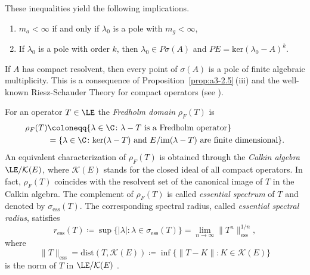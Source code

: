 \begin{example}
These inequalities yield the following implications.
\begin{enumerate}[\upshape (i)]
\item
$m_{a} < \infty$ if and only if\/ $\lambda_{0}$ is a pole with $m_{g} < \infty$,
\item
If\/ $\lambda_{0}$ is a pole with order $k$, then $\lambda_{0} \in P\sigma(A)$ and $PE = \text{ker}(\lambda_{0} - A)^{k}$.
\end{enumerate}
If\/ $A$ has compact resolvent,%
then every point of\/ $\sigma(A)$ is a pole of finite algebraic multiplicity.
This is a consequence of Proposition~\ref{prop:a3-2.5}\,(iii) and the well-known Riesz-Schauder Theory for compact operators (see \textcite[VII.4.5]{dunfordschwartz:1958}).
\end{example}
\begin{example}\label{ex:a3-3.7}	%
For an operator $T \in \LE$ the \emph{Fredholm domain} $\rho_{F}(T)$ is
\begin{equation}\label{eq:a3-3.5} 
\begin{aligned}
	\rho_{F}(T) & \coloneqq  \{\lambda \in \C \colon \lambda - T \text{ is a Fredholm operator}\}\\
	& =  \{\lambda \in \C \colon \text{ker}(\lambda - T) \text{ and }  E / \mathrm{im}(\lambda - T) \text{ are finite dimensional}\}.
\end{aligned}
\end{equation}
An equivalent characterization of\/ $\rho_{F}(T)$ is obtained through the \emph{Calkin algebra}%
$\LE/\mathcal{K}(E)$, where $\mathcal{K}(E)$ stands for the closed ideal of all compact operators.
In fact, $\rho_{F}(T)$ coincides with the resolvent set of the canonical image of\/ $T$ in the Calkin algebra.
The complement of\/ $\rho_{F}(T)$ is called \emph{essential spectrum} 
of\/ $T$ and denoted by $\sigma_{\text{ess}}(T)$.
The corresponding spectral radius, called \emph{essential spectral radius},  
satisfies
\begin{equation}\label{eq:a3-3.6}
r_{\text{ess}}(T) \coloneqq \sup \{|\lambda| \colon \lambda \in \sigma_{\text{ess}}(T)\} = \lim_{n \to \infty} \|T^{n}\|_{\text{ess}}^{1/n} ,
\end{equation}
where 
%
\[
	\|T\|_{\text{ess}} = \text{dist}(T,\mathcal{K}(E)) \coloneqq \inf \{\|T - K\| \colon K \in \mathcal{K}(E)\}
\]
%
is the norm of\/ $T$ in $\LE/\mathcal{K}(E)$ .


\end{example}
